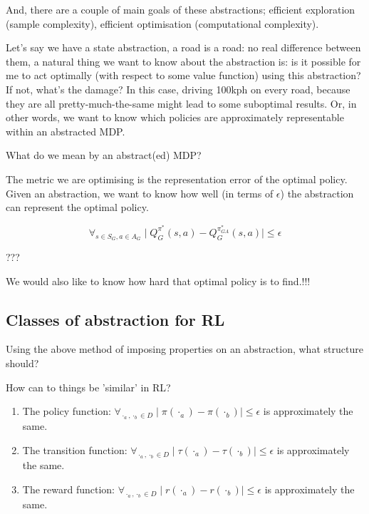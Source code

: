 And, there are a couple of main goals of these abstractions; efficient exploration
(sample complexity), efficient optimisation (computational complexity).

Let's say we have a state abstraction, a road is a road: no real difference
between them, a natural thing we want to know about the abstraction is:
is it possible for me to act optimally (with respect to some value function)
using this abstraction? If not, what's the damage? In this case, driving 100kph on every road,
because they are all pretty-much-the-same might lead to some suboptimal results.
Or, in other words, we want to know which policies are approximately representable within an abstracted MDP.

What do we mean by an abstract(ed) MDP?

The metric we are optimising is the representation error of the optimal
policy. Given an abstraction, we want to know how well (in terms of $\epsilon$) the abstraction
can represent the optimal policy.

\[
\forall_{s\in S_G, a\in A_G} \mid Q_G^{\pi^* }(s, a) - Q_G^{\pi_{GA}^* }(s, a) \mid \le \epsilon
\]
\cite{Abel2017}

???

We would also like to know how hard that optimal policy is to find.!!!


\subsection{Classes of abstraction for RL}

Using the above method of imposing properties on an abstraction, what structure should?

How can to things be 'similar' in RL?

\begin{enumerate}
\tightlist
\item
  The policy function:
  \(\forall_{\cdot_a, \cdot_b \in D} \mid \pi(\cdot_a) - \pi(\cdot_b) \mid \le \epsilon\)
  is approximately the same.
\item
  The transition function:
  \(\forall_{\cdot_a, \cdot_b \in D} \mid \tau(\cdot_a) - \tau(\cdot_b)\mid \le \epsilon\)
  is approximately the same.
\item
  The reward function:
  \(\forall_{\cdot_a, \cdot_b \in D} \mid r(\cdot_a) - r(\cdot_b) \mid \le \epsilon\)
  is approximately the same.
\end{enumerate}

